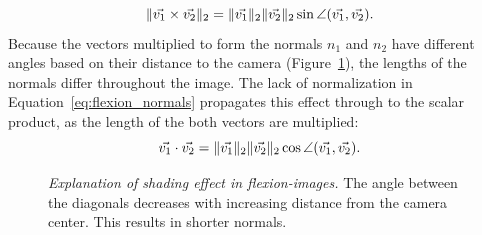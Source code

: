 \begin{equation}
    \lVert\vec{v_1} \times \vec{v_2}\rVert_{2} = \lVert\vec{v_1}\rVert_{2} \lVert\vec{v_2}\rVert_{2} \sin \angle(\vec{v_1}, \vec{v_2})\text{.}
\end{equation}
Because the vectors multiplied to form the normals $n_1$ and $n_2$ have different angles based on their distance to the camera (Figure~\ref{fig:flexion_angle_decrease}), the lengths of the normals differ throughout the image.
The lack of normalization in Equation~\ref{eq:flexion_normals} propagates this effect through to the scalar product, as the length of the both vectors are multiplied:
\begin{equation}
    \vec{v_1} \cdot \vec{v_2} = \lVert\vec{v_1}\rVert_{2} \lVert\vec{v_2}\rVert_{2} \cos \angle(\vec{v_1}, \vec{v_2})\text{.}
\end{equation}
\begin{figure}[b!]
    
    \caption[Explanation of shading effect in \glspl{flexion-image}]{\emph{Explanation of shading effect in \glspl{flexion-image}.} The angle between the diagonals decreases with increasing distance from the camera center. This results in shorter normals.}\label{fig:flexion_angle_decrease}
\end{figure}

